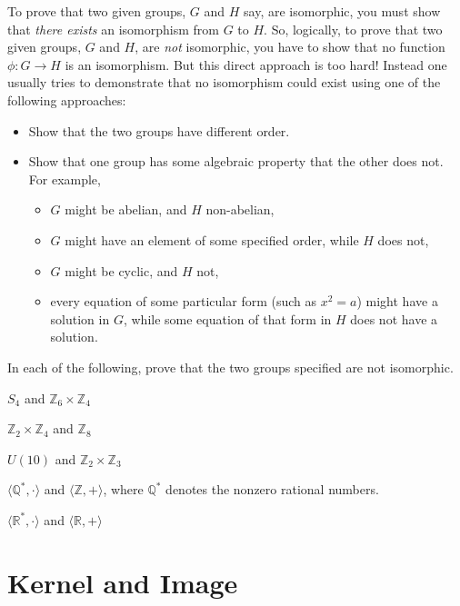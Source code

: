 To prove that two given groups, \(G\) and \(H\) say, are isomorphic, you must show that \emph{there exists} an isomorphism from \(G\) to \(H\).  So, logically, to prove that two given groups, \(G\) and \(H\), are \emph{not} isomorphic, you have to show that no function \(\phi: G \longrightarrow H \) is an isomorphism. But this direct approach is too hard! Instead one usually tries to demonstrate that no isomorphism could exist using one of the following approaches:
\begin{itemize}
  \item Show that the two groups have different order.
  \item Show that one group has some algebraic property that the other does not. For example,
  \begin{itemize}
    \item \(G\) might be abelian, and \(H\) non-abelian,
    \item \(G\) might have an element of some specified order, while \(H\) does not,
    \item \(G\) might be cyclic, and \(H\) not,
    \item every equation of some particular form (such as \(x^2 = a\)) might have a solution in \(G\), while some equation of that form in \(H\) does not have a solution.
  \end{itemize}
\end{itemize}

\begin{problem}
In each of the following, prove that the two groups specified are
not isomorphic.
      \begin{problemparts}
  \item \( S_4 \) and \(\mathbb{Z}_6 \times \mathbb{Z}_4\)
  \item \(\mathbb{Z}_2 \times \mathbb{Z}_4\) and \( \mathbb{Z}_8 \)
  \item \(U(10)\) and \(\mathbb{Z}_2 \times \mathbb{Z}_3\)
  \item \(\langle \mathbb{Q}^*, \cdot \rangle \) and \( \langle \mathbb{Z}, + \rangle \), where \(\mathbb{Q}^*\) denotes the nonzero rational numbers.
  \item \(\langle \mathbb{R}^*, \cdot \rangle \) and \( \langle \mathbb{R}, + \rangle \)
\end{problemparts}
\end{problem}

\section{Kernel and Image}

